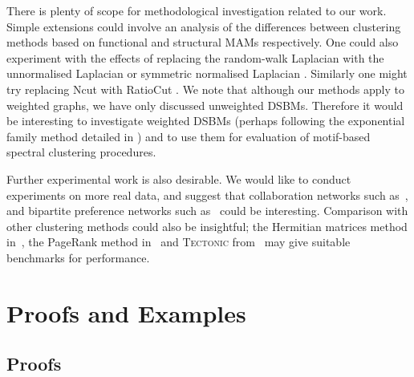 \documentclass[12pt,draft]{ociamthesis}
\theoremstyle{plain}
\theoremstyle{definition}
\theoremstyle{remark}
\begin{document}
There is plenty of scope for methodological investigation related to our work.
Simple extensions could involve an analysis of the differences between
clustering methods based on functional and structural MAMs respectively.
One could also experiment with the effects of replacing the random-walk
Laplacian with the unnormalised Laplacian or symmetric normalised Laplacian
\cite{von2007tutorial}.
Similarly one might try replacing Ncut with RatioCut \cite{hagen1992new}. We
note that although our methods apply to weighted graphs, we have only discussed
unweighted DSBMs. Therefore it would be interesting to investigate weighted
DSBMs (perhaps following the exponential family method detailed in
\cite{aicher2013adapting}) and to use them for evaluation of motif-based
spectral clustering procedures.

Further experimental work is also desirable. We would like to conduct
experiments on more real data, and suggest that collaboration networks such
as~\cite{snap:astro}, and bipartite preference networks such
as~\cite{icon:movie} could be interesting.
Comparison with other clustering methods could also be insightful; the
Hermitian matrices method in~\cite{DirectedClustImbCuts}, the PageRank method
in~\cite{yin2017local} and \textsc{Tectonic}
from~\cite{tsourakakis2017scalable} may give suitable benchmarks for
performance.

\clearpage{}

\appendix
{}

\clearpage{}
\chapter{Proofs and Examples}\label{chap:appendix_proofs}

\section{Proofs}
\end{document}
